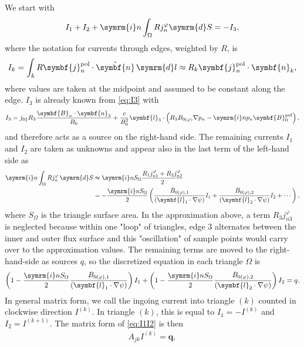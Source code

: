 \documentclass[a4paper, 10pt, english]{article}
\let\temp\vartheta
\let\vartheta\theta
\let\theta\temp
\let\temp\varphi
\let\varphi\phi
\let\phi\temp
\let\vec\symbf
\newcommand*\diff{\ensuremath{\symrm{d}}}
\newcommand*\im{\ensuremath{\symrm{i}}}
\newcommand*\pol{\ensuremath{\textrm{pol}}}
\begin{document}
We start with
\begin{gather}
  I_{1} + I_{2} + \im n \int_{\Omega} R j_{n}^{\phi} \diff S = -I_{3},
\end{gather}
where the notation for currents through edges, weighted by $R$, is
\begin{gather}
  I_{k} = \int_{k} R \vec{j}_{n}^{\pol} \cdot \hat{\vec{n}} \, \diff l \approx R_{k} \vec{j}_{n}^{\pol} \cdot \vec{n}_{k},
\end{gather}
where values are taken at the midpoint and assumed to be constant along the edge. $I_{3}$ is already known from \cref{eq:I3} with
\begin{gather}
  I_{3} = j_{0 \parallel} R_{3} \frac{\vec{B}_{n} \cdot \vec{n}_{3}}{B_{0}} + \frac{c}{B_{0}^{2}} \vec{l}_{3} \cdot \left( R_{3} B_{0 (\phi)} \nabla p_{n} - \im n p_{n} \vec{B}_{0}^{\pol} \right),
\end{gather}
and therefore acts as a source on the right-hand side. The remaining currents $I_{1}$ and $I_{2}$ are taken as unknowns and appear also in the last term of the left-hand side as
\begin{align}
  \im n \int_{\Omega} R j_{n}^{\phi} \, \diff S & \approx \im n S_{\Omega} \frac{R_{1} j_{n 1}^{\phi} + R_{2} j_{n 2}^{\phi}}{2} \nonumber \\
  &= -\frac{\im n S_{\Omega}}{2} \left( \frac{B_{0 (\phi), 1}}{(\vec{l}_{1} \cdot \nabla \psi)} I_{1} + \frac{B_{0 (\phi), 2}}{(\vec{l}_{2} \cdot \nabla \psi)} I_{2} + \dotsb \right),
\end{align}
where $S_{\Omega}$ is the triangle surface area.
 In the approximation above, a term $R_{3} j_{n 3}^{\phi}$ is neglected because within one "loop" of triangles, edge 3 alternates between the inner and outer flux surface and this "oscillation" of sample points would carry over to the approximation values.
The remaining terms are moved to the right-hand-side as sources $q$, so the discretized equation in each triangle $\Omega$ is
\begin{gather}
  \left( 1 - \frac{\im n S_{\Omega}}{2} \frac{B_{0 (\phi), 1}}{(\vec{l}_{1} \cdot \nabla \psi)} \right) I_{1} + \left( 1 - \frac{\im n S_{\Omega}}{2} \frac{B_{0 (\phi), 2}}{(\vec{l}_{2} \cdot \nabla \psi)} \right) I_{2} = q. \label{eq:I1I2}
\end{gather}
In general matrix form, we call the ingoing current into triangle $(k)$ counted in clockwise direction $I^{(k)}$. In triangle $(k)$, this is equal to $I_{1} = -I^{(k)}$ and $I_{2} = I^{(k+1)}$. The matrix form of \cref{eq:I1I2} is then
\begin{gather}
  A_{jk} I^{(k)} = \vec{q},
\end{gather}
\end{document}
